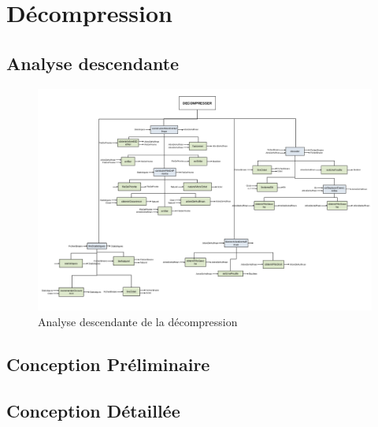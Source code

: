 \documentclass[10pt]{report}
\begin{document}
    \chapter{Décompression}

        \section{Analyse descendante}
		\begin{figure}[h] 
   			 \centering      
    		\includegraphics[width=1.1\textwidth]{decompresser.png}
    		\caption{Analyse descendante de la décompression}
    		\label{fig:exemple}
		\end{figure}
        \newpage
        \section{Conception Préliminaire}
        	
        	
        	
        	

        \newpage
        \section{Conception Détaillée}
        	
        	
        	
        	
        	
        	
\end{document}

